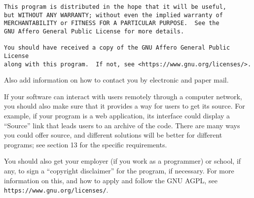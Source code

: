 \documentclass{article}%
\begin{document}
\begin{enumerate}
{\begin{verbatim}
This program is distributed in the hope that it will be useful,
but WITHOUT ANY WARRANTY; without even the implied warranty of
MERCHANTABILITY or FITNESS FOR A PARTICULAR PURPOSE.  See the
GNU Affero General Public License for more details.

You should have received a copy of the GNU Affero General Public License
along with this program.  If not, see <https://www.gnu.org/licenses/>.
\end{verbatim}
}

Also add information on how to contact you by electronic and paper mail.

If your software can interact with users remotely through a computer
network, you should also make sure that it provides a way for users to
get its source.  For example, if your program is a web application, its
interface could display a ``Source'' link that leads users to an archive
of the code.  There are many ways you could offer source, and different
solutions will be better for different programs; see section 13 for the
specific requirements.

You should also get your employer (if you work as a programmer) or
school, if any, to sign a ``copyright disclaimer'' for the program, if
necessary.  For more information on this, and how to apply and follow
the GNU AGPL, see \texttt{https://www.gnu.org/licenses/}.

\end{enumerate}
\end{document}
